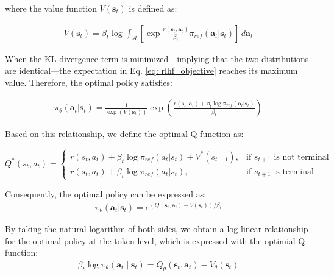 \noindent where the value function  $V(\mathbf{s}_t)$ is defined as:

\begin{align}
V(\mathbf{s}_t) = \beta_t \log \int_{\mathcal{A}} [\exp\frac{r(\mathbf{s}_t, \mathbf{a}_t)}{\beta_t} \pi_{ref}(\mathbf{a}_t | \mathbf{s}_t)] \, d\mathbf{a}_t
\end{align}

When the KL divergence term is minimized—implying that the two distributions are identical—the expectation in Eq. \eqref{eq: rlhf_objective} reaches its maximum value. Therefore, the optimal policy satisfies:

\begin{align}
\pi_\theta(\mathbf{a}_t | \mathbf{s}_t) = \frac{1}{\exp(V(\mathbf{s}_t))} \exp\left(\frac{r(\mathbf{s}_t, \mathbf{a}_t) + \beta_t \log \pi_{ref}(\mathbf{a}_t | \mathbf{s}_t)}{\beta_t}\right)
\end{align}

Based on this relationship, we define the optimal Q-function as:

\begin{equation}
Q^*(s_t, a_t) =
\begin{cases} 
r(s_t, a_t) + \beta_t \log \pi_{ref}(a_t | s_t) + V^*(s_{t+1}), & \text{if } s_{t+1} \text{ is not terminal} \\
r(s_t, a_t) + \beta_t \log \pi_{ref}(a_t | s_t), & \text{if } s_{t+1} \text{ is terminal}
\end{cases}
\label{eq: t_return}
\end{equation}

Consequently, the optimal policy can be expressed as:
\begin{align}
\pi_\theta(\mathbf{a}_t | \mathbf{s}_t) = e^{(Q(\mathbf{s}_t, \mathbf{a}_t) - V(\mathbf{s}_t))/\beta_t}
\label{eq: fixed_point_2}
\end{align}

By taking the natural logarithm of both sides, we obtain a log-linear relationship for the optimal policy at the token level, which is expressed with the optimial Q-function:
\begin{align}
\beta_t \log \pi_\theta(\mathbf{a}_t \mid \mathbf{s}_t) = Q_\theta(\mathbf{s}_t, \mathbf{a}_t) - V_\theta(\mathbf{s}_t)
\end{align}


